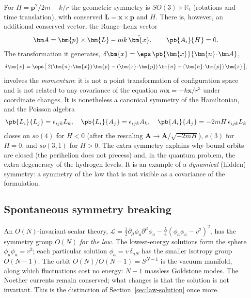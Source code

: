 For $H={\bm{p}}^2/2m-k/r$ the geometric symmetry is $SO(3)\times\mathbb R_t$
(rotations and time translation), with conserved ${\bm{L}}={\bm{x}}\times{\bm{p}}$ and $H$.
There is, however, an additional conserved vector, the Runge--Lenz vector
\begin{equation}\label{rl}
  \bm A={\bm{p}}\times{\bm{L}}-mk\,\hat{{\bm{x}}},\qquad \pb{A_i}{H}=0 .
\end{equation}
The transformation it generates, $\delta{\bm{x}}=\eps\,\pb{{\bm{x}}}{{\bm{n}}\!\cdot\!\bm A}$,
\begin{equation}
  \delta{\bm{x}}=\eps\,\big[\,2({\bm{n}}\!\cdot\!{\bm{x}})\,{\bm{p}}-({\bm{x}}\!\cdot\!{\bm{p}})\,{\bm{n}}-({\bm{n}}\!\cdot\!{\bm{p}})\,{\bm{x}}\,\big],
\end{equation}
involves the \emph{momentum}: it is not a point transformation of
configuration space and is not related to any covariance of the
equation $m\ddot{\bm{x}}=-k{\bm{x}}/r^3$ under coordinate changes. It is nonetheless a
canonical symmetry of the Hamiltonian, and the Poisson algebra
\begin{equation}
  \pb{L_i}{L_j}=\epsilon_{ijk}L_k,\quad
  \pb{L_i}{A_j}=\epsilon_{ijk}A_k,\quad
  \pb{A_i}{A_j}=-2mH\,\epsilon_{ijk}L_k
\end{equation}
closes on $so(4)$ for $H<0$ (after the rescaling $\bm A\to\bm A/\sqrt{-2mH}$),
$e(3)$ for $H=0$, and $so(3,1)$ for $H>0$. The extra symmetry explains why
bound orbits are closed (the perihelion does not precess) \cite{goldstein}
and, in the quantum problem, the extra degeneracy of the hydrogen levels.
It is an example of a \emph{dynamical} (hidden) symmetry:
a symmetry of the law that is not visible as a covariance of the formulation.

\subsection{Spontaneous symmetry breaking}

An $O(N)$-invariant scalar theory,
$\mathcal L=\tfrac12\partial_\mu\phi_a\partial^\mu\phi_a-\tfrac\lambda4(\phi_a\phi_a-v^2)^2$,
has the symmetry group $O(N)$ \emph{for the law}. The lowest-energy
solutions form the sphere $\phi_a\phi_a=v^2$; each particular solution
$\phi_a=v\,\delta_{aN}$ has the smaller isotropy group $O(N-1)$. The orbit
$O(N)/O(N-1)=S^{N-1}$ is the vacuum manifold, along which fluctuations
cost no energy: $N-1$ massless Goldstone modes. The Noether currents remain
conserved; what changes is that the solution is not invariant. This is the
distinction of Section~\ref{sec:law-solution} once more.

